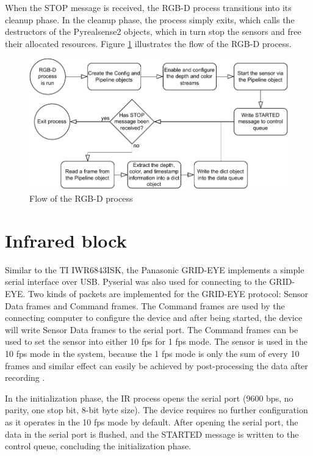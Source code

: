 When the STOP message is received,
the RGB-D process transitions into its cleanup phase.
In the cleanup phase, the process simply exits,
which calls the destructors of the Pyrealsense2 objects,
which in turn stop the sensors and free their allocated resources.
Figure \ref{fig:3-rgbd-flowchart} illustrates the flow of the RGB-D process.

\begin{figure}
    \centering
    \includegraphics{fig/3/rgbd-flowchart.pdf}
    \caption{Flow of the RGB-D process}
    \label{fig:3-rgbd-flowchart}
\end{figure}

\section{Infrared block}
\label{sec:3-ir}
Similar to the TI IWR6843ISK, the Panasonic GRID-EYE implements a simple serial interface over USB.
Pyserial was also used for connecting to the GRID-EYE.
Two kinds of packets are implemented for the GRID-EYE protocol: Sensor Data frames and Command frames.
The Command frames are used by the connecting computer to configure the device and after being started,
the device will write Sensor Data frames to the serial port.
The Command frames can be used to set the sensor into either 10 \gls{fps} for 1 \gls{fps} mode. \cite{grid-eye-protocol}
The sensor is used in the 10 \gls{fps} mode in the system, because the 1 \gls{fps} mode is only the sum of every 10 frames
and similar effect can easily be achieved by post-processing the data after recording \cite{grid-eye-manual}.

In the initialization phase, the IR process opens the serial port (9600 bps, no parity, one stop bit, 8-bit byte size).
The device requires no further configuration as it operates in the 10 \gls{fps} mode by default.
After opening the serial port, the data in the serial port is flushed,
and the STARTED message is written to the control queue,
concluding the initialization phase.

